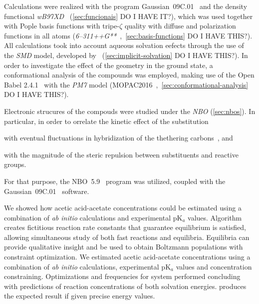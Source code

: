 Calculations were realized with the program Gaussian~09C.01~\cite{g09}
and the density functional
\emph{wB97XD}~\cite{Chai_2008a,Chai_2008b} (\cref{sec:funcionais} DO I HAVE IT?),
which was used together with Pople basis functions with tripe-$\zeta$ quality
with diffuse and polarization functions in all atoms
(\emph{6--311++G**}~\cite{Ditchfield_1971,Hehre_1972,Hariharan_1973,Hariharan_1974,Gordon_1980,Francl_1982,Clark_1983,Frisch_1984,Binning_1990,Blaudeau_1997,Rassolov_1998,Rassolov_2001},~\cref{sec:basis-functions} DO I HAVE THIS?).
All calculations took into account aqueous solvation eefects through the use of the \emph{SMD} model,
developed by~\citeauthor{Marenich_2009} (\cref{sec:implicit-solvation} DO I HAVE THIS?).
In order to investigate the effect of the geometry in the ground state,
a conformational analysis of the compounds was employed,
making use of the Open Babel 2.4.1~\cite{O_Boyle_2011}
with the \emph{PM7} model (MOPAC2016~\cite{MOPAC},~\cref{sec:conformational-analysis} DO I HAVE THIS?).

Electronic strucures of the compouds were studied under the \emph{NBO} (\cref{sec:nbos}).
In particular,
in order to orrelate the kinetic effect of the substitution
\begin{enumerate*}[label=(\roman*)]
	\item with eventual fluctuations in hybridization of the thethering carbons~\cite{Bent_1961},
	      and
	\item with the magnitude of the steric repulsion between substituents and reactive groups.
\end{enumerate*}

For that purpose,
the NBO~5.9~\cite{NBO5.9} program was utilized,
coupled with the Gaussian~09C.01~\cite{g09} software.

We showed how
acetic acid-acetate concentrations could be estimated using a combination of \emph{ab initio} calculations and experimental pK$_a$ values.
Algorithm creates fictitious reaction rate constants that guarantee equilibrium is satisfied,
allowing simultaneous study of both fast reactions and equilibria.
Equilibria can provide qualitative insight and be used to obtain Boltzmann populations with constraint optimization.
We estimated acetic acid-acetate concentrations using a combination of \emph{ab initio} calculations,
experimental pK$_a$ values and  concentration constraining.
Optimizations and frequencies for  system performed concluding with predictions of reaction concentrations of both solvation energies.
\overreact{} produces the expected result if given precise energy values.


